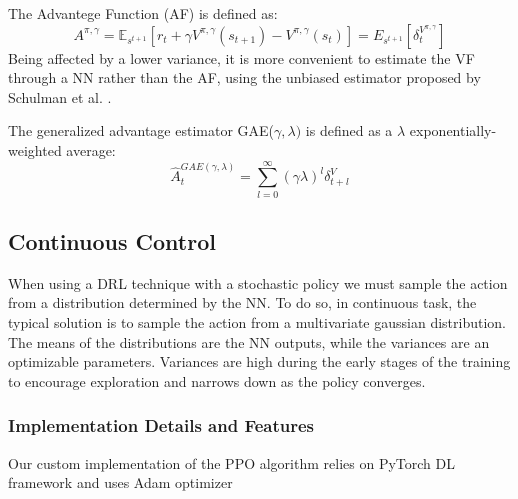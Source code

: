 \documentclass{svproc}
\begin{document}
The Advantege Function (AF) is defined as:
\begin{equation}\label{eq:TDeq} A^{\pi,\gamma} = \mathbb{E}_{s^{t+1}}\left[r_t+\gamma V^{\pi,\gamma}(s_{t+1})- V^{\pi,\gamma}(s_t)\right] = E_{s^{t+1}}\left[\delta_t^{V^{\pi,\gamma}}\right]
\end{equation}
Being affected by a lower variance, it is more convenient to estimate the VF through a NN rather than the AF, using the unbiased estimator proposed by Schulman et al. \cite{Schulman15GAE}.

The generalized advantage estimator GAE($\gamma, \lambda)$ is defined as a $\lambda$ exponentially-weighted average:
\begin{equation}\label{eq:GAE}
\hat{A}_t^{GAE(\gamma,\lambda)} = \sum_{l=0}^\infty(\gamma\lambda)^l\delta_{t+l}^V
\end{equation}


\subsection{Continuous Control}
When using a DRL technique with a stochastic policy we must sample the action from a distribution determined by the NN. To do so, in continuous task, the typical solution is to sample the action from a multivariate gaussian distribution. The means of the distributions are the NN outputs, while the variances are an optimizable parameters. Variances are high during the early stages of the training to encourage exploration and narrows down as the policy converges.


\subsubsection{Implementation Details and Features}
Our custom implementation of the PPO algorithm relies on PyTorch DL framework and uses Adam optimizer
\end{document}
